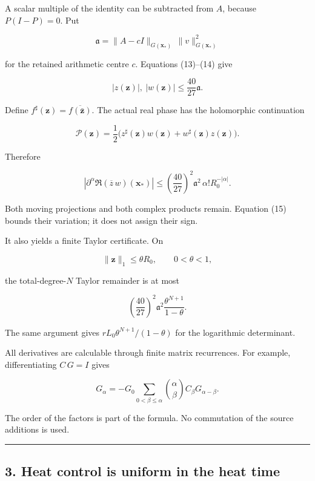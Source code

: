 \documentclass[11pt]{article}
\begin{document}
A scalar multiple of the identity can be subtracted from \(A\), because \(P(I-P)=0\). Put

\[
\mathfrak a=
\|A-cI\|_{G(\mathbf x_*)}\,\|v\|_{G(\mathbf x_*)}^2
\]

for the retained arithmetic centre \(c\). Equations (13)--(14) give

\[
|z(\mathbf z)|,\ |w(\mathbf z)|
\le\frac{40}{27}\mathfrak a.
\]

Define \(f^\sharp(\mathbf z)=\overline{f(\bar{\mathbf z})}\). The actual real phase has the holomorphic continuation

\[
\mathcal P(\mathbf z)
=
\frac12\bigl(z^\sharp(\mathbf z)w(\mathbf z)
+w^\sharp(\mathbf z)z(\mathbf z)\bigr).
\]

Therefore

\[
\boxed{
\left|
\partial^\alpha
\Re(\overline z\,w)(\mathbf x_*)
\right|
\le
\left(\frac{40}{27}\right)^2
\mathfrak a^2\,\alpha!R_0^{-|\alpha|}.
}
\tag{15}
\]

Both moving projections and both complex products remain. Equation (15) bounds their variation; it does not assign their sign.

It also yields a finite Taylor certificate. On

\[
\|\mathbf z\|_1\le\theta R_0,\qquad 0<\theta<1,
\]

the total-degree-\(N\) Taylor remainder is at most

\[
\boxed{
\left(\frac{40}{27}\right)^2
\mathfrak a^2\frac{\theta^{N+1}}{1-\theta}.
}
\tag{16}
\]

The same argument gives \(rL_0\theta^{N+1}/(1-\theta)\) for the logarithmic determinant.

All derivatives are calculable through finite matrix recurrences. For example, differentiating \(C\,G=I\) gives

\[
\boxed{
G_\alpha
=
-G_0
\sum_{0<\beta\le\alpha}
\binom{\alpha}{\beta}
C_\beta G_{\alpha-\beta}.
}
\tag{17}
\]

The order of the factors is part of the formula. No commutation of the source additions is used.

\begin{center}\rule{0.5\linewidth}{0.5pt}\end{center}

\subsection{3. Heat control is uniform in the heat time}\label{heat-control-is-uniform-in-the-heat-time}
\end{document}
